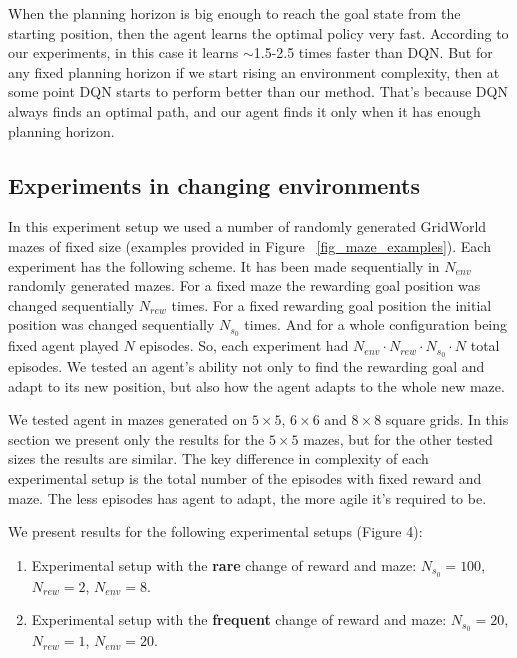 \documentclass[runningheads]{llncs}
\begin{document}
When the planning horizon is big enough to reach the goal state from the starting position, then the agent learns the optimal policy very fast. According to our experiments, in this case it learns $\sim$1.5-2.5 times faster than DQN. But for any fixed planning horizon if we start rising an environment complexity, then at some point DQN starts to perform better than our method. That's because DQN always finds an optimal path, and our agent finds it only when it has enough planning horizon.

\subsection{Experiments in changing environments}

In this experiment setup we used a number of randomly generated GridWorld mazes of fixed size (examples provided in Figure ~\ref{fig_maze_examples}). Each experiment has the following scheme. It has been made sequentially in $N_{env}$ randomly generated mazes. For a fixed maze the rewarding goal position was changed sequentially $N_{rew}$ times. For a fixed rewarding goal position the initial position was changed sequentially $N_{s_0}$ times. And for a whole configuration being fixed agent played $N$ episodes. So, each experiment had $N_{env} \cdot N_{rew} \cdot N_{s_0} \cdot N$ total episodes. We tested an agent's ability not only to find the rewarding goal and adapt to its new position, but also how the agent adapts to the whole new maze.

We tested agent in mazes generated on $5 \times 5$, $6 \times 6$ and $8 \times 8$ square grids. In this section we present only the results for the $5 \times 5$ mazes, but for the other tested sizes the results are similar. The key difference in complexity of each experimental setup is the total number of the episodes with fixed reward and maze. The less episodes has agent to adapt, the more agile it's required to be.

We present results for the following experimental setups (Figure 4):

\begin{enumerate}
  \item Experimental setup with the \textbf{rare} change of reward and maze: $N_{s_0} = 100$, $N_{rew} = 2$, $N_{env} = 8$.

  \item Experimental setup with the \textbf{frequent} change of reward and maze: $N_{s_0} = 20$, $N_{rew} = 1$, $N_{env} = 20$.
\end{enumerate}
\end{document}
